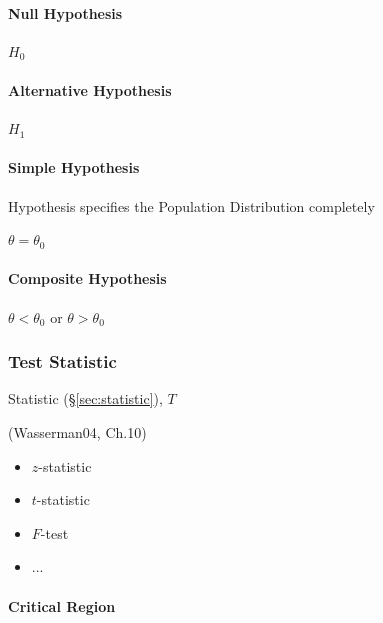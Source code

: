 \paragraph{Null Hypothesis}\label{sec:null_hypothesis}\hfill

$H_0$



\paragraph{Alternative Hypothesis}\label{sec:alternative_hypothesis}\hfill

$H_1$



\paragraph{Simple Hypothesis}\label{sec:simple_hypothesis}\hfill

Hypothesis specifies the Population Distribution completely

$\theta = \theta_0$



\paragraph{Composite Hypothesis}\label{sec:composite_hypothesis}\hfill

$\theta < \theta_0$ or $\theta > \theta_0$



\subsubsection{Test Statistic}\label{sec:test_statistic}

Statistic (\S\ref{sec:statistic}), $T$

(Wasserman04, Ch.10)

\begin{itemize}
  \item $z$-statistic
  \item $t$-statistic
  \item $F$-test
  \item ...
\end{itemize}



\paragraph{Critical Region}\label{sec:critical_region}\hfill

